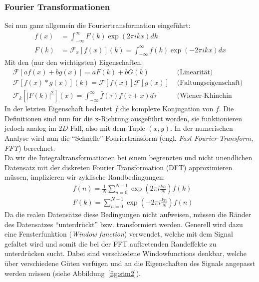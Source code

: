 \subsubsection{Fourier Transformationen}
Sei nun ganz allgemein die Fouriertransformation eingeführt:
\begin{align}
f(x) &= \int_{-\infty}^{\infty} F(k)\exp(2\pi i kx)dk\\
F(k) &= \mathcal{F}_x\left [f(x)\right ](k) =
\int_{-\infty}^{\infty} f(k)\exp(-2\pi i kx)dx
\end{align}
Mit den (nur den wichtigsten) Eigenschaften:
\begin{align}
&\mathcal{F}\left [a f(x) + b g(x)\right ]
    = a F(k) + b G(k) 
    &\mbox{ (Linearität) }\\
&\mathcal{F}\left [f(x) * g(x)\right ](k)
    = \mathcal{F}\left [f(x)\right ]\mathcal{F}\left [g(x)\right ]
    \! &\mbox{ (Faltungseigenschaft) }\\
&\mathcal{F}_k\left [\left | F(k) \right |^2\right ](x)
   =  \int_{-\infty}^{\infty}\bar{f}(\tau)f(\tau + x) d\tau 
   &\mbox{ (Wiener-Khinchin Theorem) }
\end{align}
In der letzten Eigenschaft
bedeutet $\bar{f}$ die komplexe Konjugation von $f$.
Die Definitionen sind nun für die x-Richtung ausgeführt worden,
sie funktionieren jedoch analog im $2D$ Fall, also mit dem Tuple
$(x,y)$. In der numerischen Analyse wird nun die ``Schnelle''
Fouriertransform (engl. \textit{Fast Fourier Transform, FFT})
berechnet. \\Da wir die Integraltransformationen
bei einem begrenzten und
nicht unendlichen Datensatz mit der
diskreten Fourier Transformation (DFT)
approximieren müssen, implizieren wir zyklische Randbedingungen:
\begin{align}
 &f(n) = \frac{1}{N}\sum_{n=0}^{N-1}{\exp(2\pi i \frac{kn}{N})f(k) }\\
 &F(k) = \sum_{n=0}^{N-1}{\exp(-2\pi i \frac{kn}{N})f(n) }
\end{align}
Da die realen Datensätze diese Bedingungen nicht aufweisen, müssen
die Ränder des Datensatzes ``unterdrückt'' bzw. transformiert
werden. Generell wird dazu eine Fensterfunktion (\textit{Window
function}) verwendet, welche mit dem Signal gefaltet wird und
somit die bei der FFT auftretenden Randeffekte zu unterdrücken 
sucht. Dabei sind verschiedene Windowfunctions denkbar, welche
über verschiedene Güten verfügen und an die Eigenschaften
des Signals angepasst werden müssen (siehe Abbildung~\ref{fig:stm2}).

